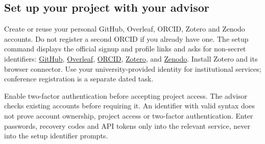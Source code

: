 \subsection{Set up your project with your advisor}
\label{app:setup:terminal}

Create or reuse your personal GitHub, Overleaf, ORCID, Zotero and Zenodo accounts.
Do not register a second ORCID if you already have one. The setup command displays
the official signup and profile links and asks for non-secret identifiers:
\href{https://github.com/signup}{GitHub},
\href{https://www.overleaf.com/register}{Overleaf},
\href{https://orcid.org/register}{ORCID},
\href{https://www.zotero.org/user/register}{Zotero}, and
\href{https://zenodo.org/signup/}{Zenodo}.
Install Zotero and its browser connector. Use your university-provided identity
for institutional services; conference registration is a separate dated task.

Enable two-factor authentication before accepting project access. The advisor
checks existing accounts before requiring it. An identifier with valid syntax
does not prove account ownership, project access or two-factor authentication.
Enter passwords, recovery codes and API tokens only into the relevant service,
never into the setup identifier prompts.

